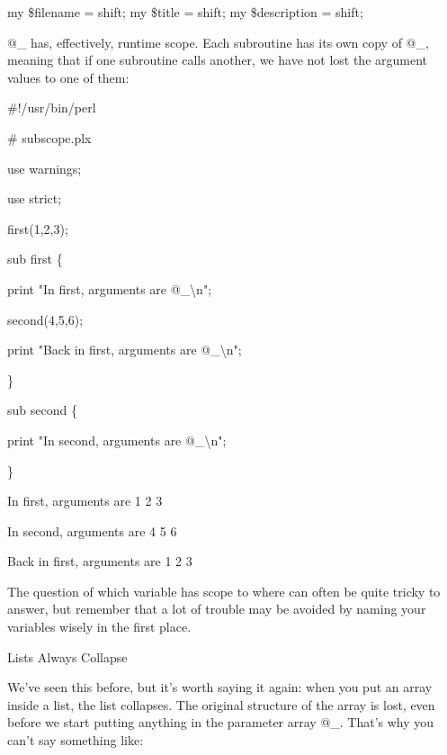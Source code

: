 \documentclass[a4paper,11pt]{book}
\begin{document}
\noindent 

\noindent my \$filename = shift; my \$title = shift; my \$description = shift;

\noindent 

\noindent @\_ has, effectively, runtime scope. Each subroutine has its own copy of @\_, meaning that if one subroutine calls another, we have not lost the argument values to one of them:

\noindent 

\noindent \#!/usr/bin/perl

\noindent \# subscope.plx

\noindent use warnings;

\noindent use strict;

\noindent 

\noindent first(1,2,3);

\noindent 

\noindent sub first \{

\noindent print "In first, arguments are @\_\textbackslash n";

\noindent second(4,5,6);

\noindent print "Back in first, arguments are @\_\textbackslash n";

\noindent 

\noindent \}

\noindent sub second \{

\noindent print "In second, arguments are @\_\textbackslash n";

\noindent \}

\noindent 

\noindent In first, arguments are 1 2 3

\noindent In second, arguments are 4 5 6 

\noindent Back in first, arguments are 1 2 3

\noindent 

\noindent The question of which variable has scope to where can often be quite tricky to answer, but remember that a lot of trouble may be avoided by naming your variables wisely in the first place.

\noindent 

\noindent Lists Always Collapse

\noindent 

\noindent We've seen this before, but it's worth saying it again: when you put an array inside a list, the list collapses. The original structure of the array is lost, even before we start putting anything in the parameter array @\_. That's why you can't say something like:
\end{document}
